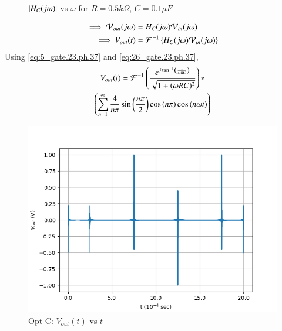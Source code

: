 \documentclass[journal,12pt,twocolumn]{IEEEtran}
\theoremstyle{remark}
\begin{document}
\begin{enumerate}
\begin{figure}[!h]
        \caption{$\left\vert H_C(j\omega)\right\vert$ vs $\omega$ for $R=0.5k\Omega$, $C=0.1\mu F$}
        \label{fig:opt_c_hf_gate.ph.23.37}
    \end{figure}
    \begin{align}
        \implies \mathcal{V}_{out}(j\omega) &= H_C(j\omega)\mathcal{V}_{in}(j\omega)\\
        \implies V_{out}(t) &= \mathcal{F}^{-1}\left\{H_C(j\omega)\mathcal{V}_{in}(j\omega)\right\}
    \end{align}
     Using \eqref{eq:5_gate.23.ph.37} and \eqref{eq:26_gate.23.ph.37}, 
    \begin{multline}
    V_{out}(t)=\mathcal{F}^{-1}\left(\frac{e^{j\tan^{-1}\left(\frac{1}{\omega RC}\right)}}{\sqrt{1 + (\omega R C)^2}}\right)\ast\\ \left(\sum_{n = 1}^{\infty}\frac{4}{n\pi}\sin{\ensuremath{\left(\frac{n\pi}{2}\right)}}\cos\left({n\pi}\right) \cos{\ensuremath{\left(n\omega t\right)}}\right)
    \end{multline}
    \begin{figure}[!h]
        \centering
        \includegraphics[width = \columnwidth]{figs/opt_c_res.png}
        \caption{Opt C: $V_{out}(t)$ vs $t$}
        \label{fig:opt_c_res_gate.23.ph.37}
    \end{figure}
    

\end{enumerate}
\end{document}
